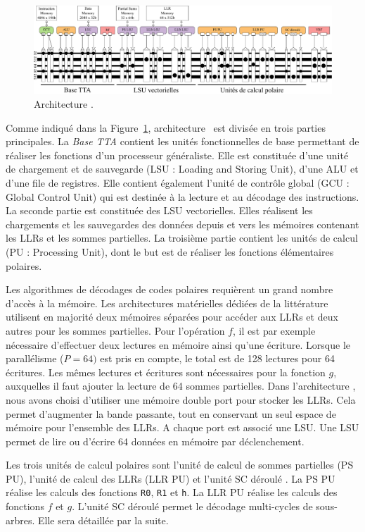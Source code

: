 \begin{figure}[t]
	\centering
	\includegraphics[width=\textwidth]{main/ch4_fig/archi_sc}
	\caption{Architecture \TTSC.}
	\label{fig:prode}
\end{figure}

Comme indiqué dans la Figure~\ref{fig:prode}, architecture \TTSC~est divisée en trois parties principales. La \textit{Base TTA} contient les unités fonctionnelles de base permettant de réaliser les fonctions d'un processeur généraliste. Elle est constituée d'une unité de chargement et de sauvegarde (LSU : Loading and Storing Unit), d'une ALU et d'une file de registres. Elle contient également l'unité de contrôle global (GCU : Global Control Unit) qui est destinée à la lecture et au décodage des instructions. La seconde partie est constituée des LSU vectorielles. Elles réalisent les chargements et les sauvegardes des données depuis et vers les mémoires contenant les LLRs et les sommes partielles.
La troisième partie contient les unités de calcul (PU : Processing Unit), dont le but est de réaliser les fonctions élémentaires polaires.

Les algorithmes de décodages de codes polaires requièrent un grand nombre d'accès à la mémoire. Les architectures matérielles dédiées de la littérature utilisent en majorité deux mémoires séparées pour accéder aux LLRs et deux autres pour les sommes partielles. Pour l'opération $f$, il est par exemple nécessaire d'effectuer deux lectures en mémoire ainsi qu'une écriture. Lorsque le parallélisme ($P=64)$ est pris en compte, le total est de 128 lectures pour 64 écritures. Les mêmes lectures et écritures sont nécessaires pour la fonction $g$, auxquelles il faut ajouter la lecture de 64 sommes partielles. Dans l'architecture \TTSC, nous avons choisi d'utiliser une mémoire double port pour stocker les LLRs. Cela permet d'augmenter la bande passante, tout en conservant un seul espace de mémoire pour l'ensemble des LLRs. A chaque port est associé une LSU. Une LSU permet de lire ou d'écrire 64 données en mémoire par déclenchement.

Les trois unités de calcul polaires sont l'unité de calcul de sommes partielles (PS PU), l'unité de calcul des LLRs (LLR PU) et l'unité \og SC déroulé \fg. La PS PU réalise les calculs des fonctions \texttt{R0}, \texttt{R1} et \texttt{h}. La LLR PU réalise les calculs des fonctions $f$ et $g$. L'unité \og SC déroulé \fg permet le décodage multi-cycles de sous-arbres. Elle sera détaillée par la suite. 

